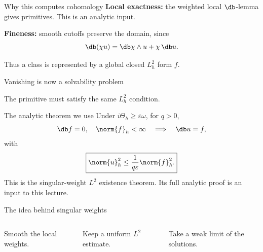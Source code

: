 \begin{frame}{Why this computes cohomology}
\textbf{Local exactness:} the weighted local \(\db\)-lemma gives primitives.
This is an analytic input.
\par\bigskip
\par \textbf{Fineness:} smooth cutoffs preserve the domain, since
\[
\db(\chi u)=\db\chi\wedge u+\chi\,\db u.
\]
\par\bigskip
\par Thus a class is represented by a global closed \(L^2_h\) form \(f\).
\end{frame}

\begin{frame}{Vanishing is now a solvability problem}
\begin{center}
\end{center}
The primitive must satisfy the same \(L^2_h\) condition.
\end{frame}

\begin{frame}{The analytic theorem we use}
Under \(i\Theta_h\ge\varepsilon\omega\), for \(q>0\),
\[
\db f=0,\quad \norm{f}_h<\infty
\quad\Longrightarrow\quad
\db u=f,
\]
with
\[
\boxed{\norm{u}_h^2\le\frac{1}{q\varepsilon}\norm{f}_h^2.}
\]
This is the singular-weight \(L^2\) existence theorem.
Its full analytic proof is an input to this lecture.
\end{frame}

\begin{frame}{The idea behind singular weights}
\begin{columns}[c]
\centering
{}
Smooth the local weights.
\par\bigskip
\par Keep a uniform \(L^2\) estimate.
\par\bigskip
\par Take a weak limit of the solutions.
\end{columns}
\end{frame}

